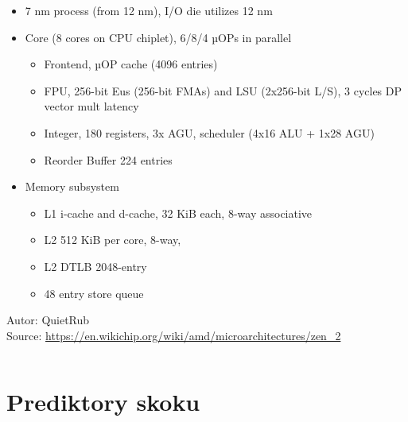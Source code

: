 \documentclass{beamer}
\begin{document}
\begin{frame}
\begin{columns}[T]
\begin{column}{0.66\textwidth}
\scriptsize
\begin{itemize}
\item 7 nm process (from 12 nm), I/O die utilizes 12 nm
\item Core (8 cores on CPU chiplet),  6/8/4 µOPs in parallel
\begin{itemize}
\scriptsize
\item Frontend, µOP cache (4096 entries)
\item FPU, 256-bit Eus (256-bit FMAs) and LSU (2x256-bit L/S), 3 cycles DP vector mult latency
\item Integer, 180 registers, 3x AGU, scheduler (4x16 ALU + 1x28 AGU)
\item Reorder Buffer 224 entries
\end{itemize}
\item Memory subsystem
\begin{itemize}
\scriptsize
\item L1 i-cache and d-cache, 32 KiB each,  8-way associative
\item L2 512 KiB per core, 8-way, 
\item L2 DTLB 2048-entry
\item 48 entry store queue
\end{itemize}
\end{itemize}
Autor: QuietRub\\
Source: \url{https://en.wikichip.org/wiki/amd/microarchitectures/zen_2}
\end{column}
\end{columns}

\end{frame}


\section{Prediktory skoku}
\end{document}

